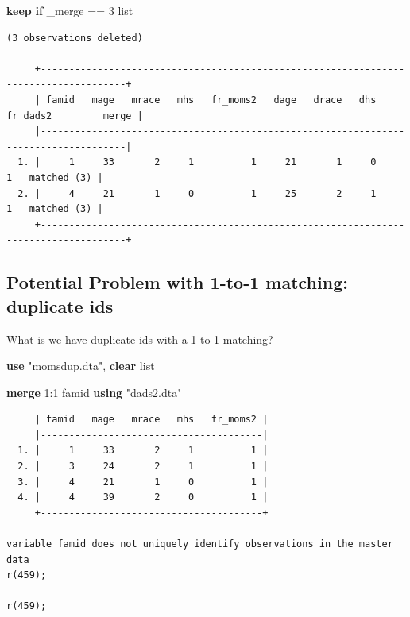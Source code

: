 \documentclass[
]{book}
\newenvironment{Shaded}{\begin{snugshade}}{\end{snugshade}}
\newcommand{\DataTypeTok}[1]{\textcolor[rgb]{0.13,0.29,0.53}{#1}}
\newcommand{\KeywordTok}[1]{\textcolor[rgb]{0.13,0.29,0.53}{\textbf{#1}}}
\newcommand{\NormalTok}[1]{#1}
\newcommand{\OtherTok}[1]{\textcolor[rgb]{0.56,0.35,0.01}{#1}}
\newcommand{\StringTok}[1]{\textcolor[rgb]{0.31,0.60,0.02}{#1}}
\begin{document}
\begin{Shaded}
\begin{Highlighting}[]
\KeywordTok{keep} \KeywordTok{if} \DataTypeTok{\_merge}\NormalTok{ == 3}
\OtherTok{list}
\end{Highlighting}
\end{Shaded}

\begin{verbatim}
(3 observations deleted)

     +-------------------------------------------------------------------------------------+
     | famid   mage   mrace   mhs   fr_moms2   dage   drace   dhs   fr_dads2        _merge |
     |-------------------------------------------------------------------------------------|
  1. |     1     33       2     1          1     21       1     0          1   matched (3) |
  2. |     4     21       1     0          1     25       2     1          1   matched (3) |
     +-------------------------------------------------------------------------------------+
\end{verbatim}

\subsection{Potential Problem with 1-to-1 matching: duplicate ids}\label{potential-problem-with-1-to-1-matching-duplicate-ids}

What is we have duplicate ids with a 1-to-1 matching?

\begin{Shaded}
\begin{Highlighting}[]
\KeywordTok{use} \StringTok{"momsdup.dta"}\NormalTok{, }\KeywordTok{clear}
\OtherTok{list}

\KeywordTok{merge}\NormalTok{ 1:1 famid }\KeywordTok{using} \StringTok{"dads2.dta"}
\end{Highlighting}
\end{Shaded}

\begin{verbatim}
     | famid   mage   mrace   mhs   fr_moms2 |
     |---------------------------------------|
  1. |     1     33       2     1          1 |
  2. |     3     24       2     1          1 |
  3. |     4     21       1     0          1 |
  4. |     4     39       2     0          1 |
     +---------------------------------------+

variable famid does not uniquely identify observations in the master data
r(459);

r(459);
\end{verbatim}
\end{document}
